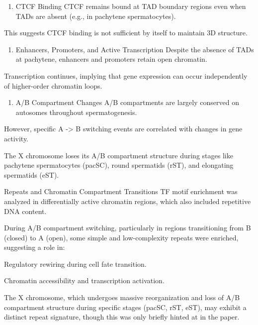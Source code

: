 \documentclass[
  a4paper,
]{scrbook}
\providecommand{\tightlist}{%
  \setlength{\itemsep}{0pt}\setlength{\parskip}{0pt}}
\begin{document}
\begin{enumerate}
\def\labelenumi{\arabic{enumi}.}
\setcounter{enumi}{1}
\tightlist
\item
  CTCF Binding CTCF remains bound at TAD boundary regions even when TADs
  are absent (e.g., in pachytene spermatocytes).
\end{enumerate}

This suggests CTCF binding is not sufficient by itself to maintain 3D
structure.

\begin{enumerate}
\def\labelenumi{\arabic{enumi}.}
\setcounter{enumi}{2}
\tightlist
\item
  Enhancers, Promoters, and Active Transcription Despite the absence of
  TADs at pachytene, enhancers and promoters retain open chromatin.
\end{enumerate}

Transcription continues, implying that gene expression can occur
independently of higher-order chromatin loops.

\begin{enumerate}
\def\labelenumi{\arabic{enumi}.}
\setcounter{enumi}{3}
\tightlist
\item
  A/B Compartment Changes A/B compartments are largely conserved on
  autosomes throughout spermatogenesis.
\end{enumerate}

However, specific A -\textgreater{} B switching events are correlated
with changes in gene activity.

The X chromosome loses its A/B compartment structure during stages like
pachytene spermatocytes (pacSC), round spermatids (rST), and elongating
spermatids (eST).

Repeats and Chromatin Compartment Transitions TF motif enrichment was
analyzed in differentially active chromatin regions, which also included
repetitive DNA content.

During A/B compartment switching, particularly in regions transitioning
from B (closed) to A (open), some simple and low-complexity repeats were
enriched, suggesting a role in:

Regulatory rewiring during cell fate transition.

Chromatin accessibility and transcription activation.

The X chromosome, which undergoes massive reorganization and loss of A/B
compartment structure during specific stages (pacSC, rST, eST), may
exhibit a distinct repeat signature, though this was only briefly hinted
at in the paper.
\end{document}
